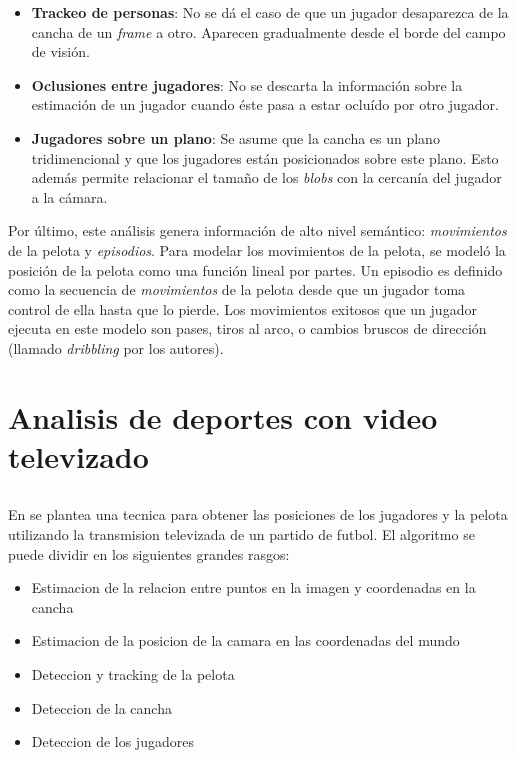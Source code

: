 \documentclass[a4paper,10pt]{article}
\begin{document}
\begin{itemize}
  \item \textbf{Trackeo de personas}: No se dá el caso de que un jugador
    desaparezca de la cancha de un \textit{frame} a otro. Aparecen gradualmente
    desde el borde del campo de visión.

  \item \textbf{Oclusiones entre jugadores}: No se descarta la información
    sobre la estimación de un jugador cuando éste pasa a estar ocluído por otro
    jugador.

  \item \textbf{Jugadores sobre un plano}: Se asume que la cancha es un plano
    tridimencional y que los jugadores están posicionados sobre este plano.
    Esto además permite relacionar el tamaño de los \textit{blobs} con la
    cercanía del jugador a la cámara.

\end{itemize}

Por último, este análisis genera información de alto nivel semántico:
\textit{movimientos} de la pelota y \textit{episodios}. Para modelar los
movimientos de la pelota, se modeló la posición de la pelota como una función
lineal por partes. Un episodio es definido como la secuencia de
\textit{movimientos} de la pelota desde que un jugador toma control de ella
hasta que lo pierde. Los movimientos exitosos que un jugador ejecuta en este
modelo son pases, tiros al arco, o cambios bruscos de dirección (llamado
\textit{dribbling} por los autores).

\section{Analisis de deportes con video televizado}
\label{sec:tv-video}

\subsection{}

En \cite{LIU20061146} se plantea una tecnica para obtener las posiciones de los jugadores y la pelota utilizando la transmision televizada de un partido de futbol.
El algoritmo se puede dividir en los siguientes grandes rasgos:
\begin{itemize}
\item Estimacion de la relacion entre puntos en la imagen y coordenadas en la cancha
\item Estimacion de la posicion de la camara en las coordenadas del mundo
\item Deteccion y tracking de la pelota
\item Deteccion de la cancha
\item Deteccion de los jugadores
\end{itemize}
\end{document}
